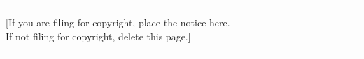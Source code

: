 \noindent
\newcommand\tab[1][1cm]{\hspace*{#1}}
\\~\\
\setlength{\arrayrulewidth}{.6em}
\vspace{4pt}
\hrule
\vspace{4pt}
\tab[2cm]
\small
[If you are filing for copyright, place the notice here.\\
\tab If not filing for copyright, delete this page.]

\vspace{4pt}
\hrule
\vspace{4pt}
